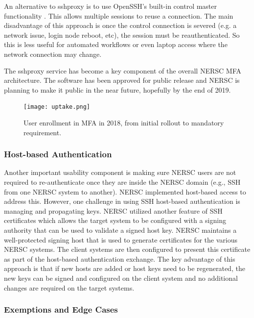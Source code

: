 \documentclass[sigconf,review]{acmart}
\begin{document}
An alternative to sshproxy is to use OpenSSH's built-in control master functionality \cite{openssh}.
This allows multiple sessions to reuse a connection.  The main disadvantage of this
approach is once the control connection is severed (e.g. a network issue, login node
reboot, etc), the session must be reauthenticated.  So this is less useful for automated
workflows or even laptop access where the network connection may change.

The sshproxy service has become a key component of the overall NERSC MFA
architecture.  The software has been approved for public release and NERSC is
planning to make it public in the near future, hopefully by the end of 2019.

\begin{figure}[ht!]
  \centering
  \texttt{[image: uptake.png]}
  \caption{User enrollment in MFA in 2018, from initial rollout to mandatory requirement.}
  \label{uptake}
\end{figure}

\subsubsection{Host-based Authentication}
\label{host}

Another important usability component is making sure NERSC users are not
required to re-authenticate once they are inside the NERSC domain (e.g., SSH
from one NERSC system to another).  NERSC implemented host-based access to
address this.  However, one challenge in using SSH host-based authentication is
managing and propagating keys.  NERSC utilized another feature of SSH
certificates \cite{redhat2019} which allows the target system to be configured
with a signing authority that can be used to validate a signed host key.  NERSC
maintains a well-protected signing host that is used to generate certificates
for the various NERSC systems.  The client systems are then configured to
present this certificate as part of the host-based authentication exchange.  The
key advantage of this approach is that if new hosts are added or host keys need
to be regenerated, the new keys can be signed and configured on the client
system and no additional changes are required on the target systems.

\subsubsection{Exemptions and Edge Cases}
\label{edge}
\end{document}

